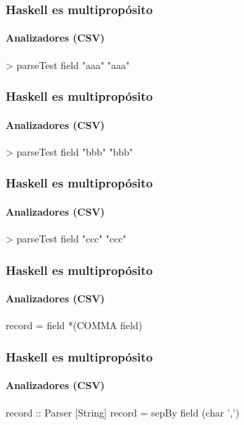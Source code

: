 \documentclass[spanish]{beamer}
\begin{document}

\begin{frame}[fragile]
  \frametitle{Haskell es multipropósito}
  \framesubtitle{Analizadores (CSV)}

  \begin{code}
> parseTest field "aaa"
"aaa"
  \end{code}
\end{frame}


\begin{frame}[fragile]
  \frametitle{Haskell es multipropósito}
  \framesubtitle{Analizadores (CSV)}

  \begin{code}
> parseTest field "bbb"
"bbb"
  \end{code}
\end{frame}


\begin{frame}[fragile]
  \frametitle{Haskell es multipropósito}
  \framesubtitle{Analizadores (CSV)}

  \begin{code}
> parseTest field "ccc"
"ccc"
  \end{code}
\end{frame}


\begin{frame}[fragile]
  \frametitle{Haskell es multipropósito}
  \framesubtitle{Analizadores (CSV)}

  \begin{code}
record = field *(COMMA field)
  \end{code}
\end{frame}


\begin{frame}[fragile]
  \frametitle{Haskell es multipropósito}
  \framesubtitle{Analizadores (CSV)}

  \begin{code}
record :: Parser [String]
record = sepBy field (char ',')
  \end{code}
\end{frame}
\end{document}
